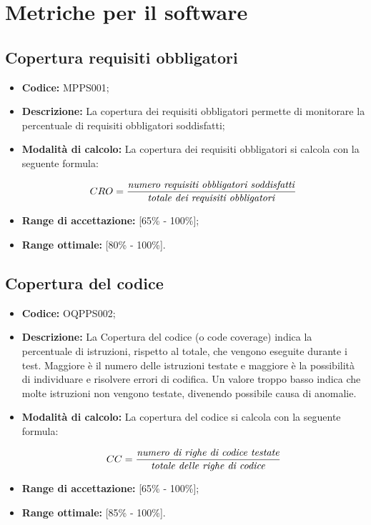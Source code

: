 \documentclass[openany,12pt,a4paper]{report}
\begin{document}

\section{Metriche per il software}

\subsection{Copertura requisiti obbligatori}

\begin{itemize}
    \item \textbf{Codice:} MPPS001;
    \item \textbf{Descrizione:} La copertura dei requisiti obbligatori permette di monitorare la percentuale di requisiti obbligatori soddisfatti;
    \item \textbf{Modalità di calcolo:} La copertura dei requisiti obbligatori si calcola con la seguente formula:
    
    \[ CRO = \frac{\textrm{\textit{numero requisiti obbligatori soddisfatti}}}{\textrm{\textit{totale dei requisiti obbligatori}}} \]
    
    \item \textbf{Range di accettazione:} [65\% - 100\%];
    \item \textbf{Range ottimale:} [80\% - 100\%].
\end{itemize}

\subsection{Copertura del codice}

\begin{itemize}

    \item \textbf{Codice:} OQPPS002;

    \item \textbf{Descrizione:} La Copertura del codice (o code coverage) indica la percentuale di istruzioni,  rispetto al totale, che vengono eseguite durante i test. Maggiore è il numero delle istruzioni testate e maggiore è la possibilità di individuare e risolvere errori di codifica. Un valore troppo basso indica che molte istruzioni non vengono testate, divenendo possibile causa di anomalie.
    
    \item \textbf{Modalità di calcolo:} La copertura del codice si calcola con la seguente formula:
    
    \[ CC = \frac{\textrm{\textit{numero di righe di codice testate}}}{\textrm{\textit{totale delle righe di codice}}} \]
    
    \item \textbf{Range di accettazione:} [65\% - 100\%];
    \item \textbf{Range ottimale:} [85\% - 100\%].
\end{itemize}
\end{document}

